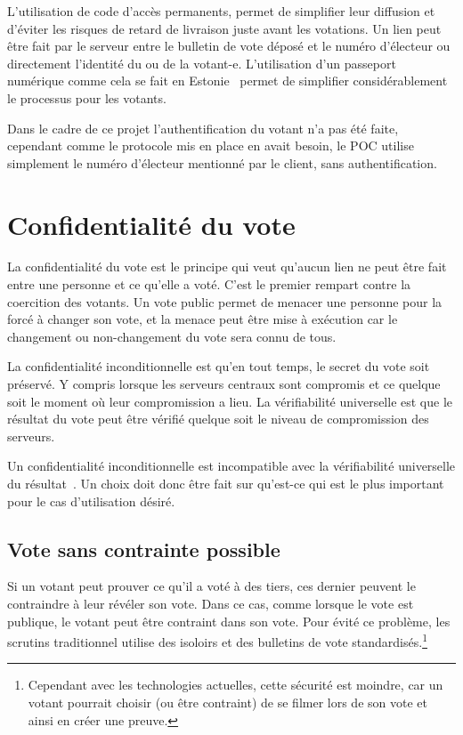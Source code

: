 \documentclass[../report]{subfiles}
\begin{document}
L'utilisation de code d'accès permanents, permet de simplifier leur diffusion et d'éviter les risques de retard de livraison juste avant les votations.
Un lien peut être fait par le serveur entre le bulletin de vote déposé et le numéro d'électeur ou directement l'identité du ou de la votant-e.
L'utilisation d'un passeport numérique comme cela se fait en Estonie~\cite{vassil_diffusion_2016} permet de simplifier considérablement le processus
pour les votants.

Dans le cadre de ce projet l'authentification du votant n'a pas été faite, cependant comme le protocole mis en place en avait besoin, le POC utilise 
simplement le numéro d'électeur mentionné par le client, sans authentification.

\section{Confidentialité du vote}

La confidentialité du vote est le principe qui veut qu'aucun lien ne peut être fait entre une personne et ce qu'elle a voté.
C'est le premier rempart contre la coercition des votants.
Un vote public permet de menacer une personne pour la forcé à changer son vote, et la menace peut être mise à exécution
car le changement ou non-changement du vote sera connu de tous.

La confidentialité inconditionnelle est qu'en tout temps, le secret du vote soit préservé.
Y compris lorsque les serveurs centraux sont compromis et ce quelque soit le moment où leur compromission a lieu.
La vérifiabilité universelle est que le résultat du vote peut être vérifié quelque soit le niveau de compromission
des serveurs.

Un confidentialité inconditionnelle est incompatible avec la vérifiabilité universelle du 
résultat~\cite{chevallier-mames_incompatible_2010,gharadaghy_verifiability_2010}.
Un choix doit donc être fait sur qu'est-ce qui est le plus important pour le cas d'utilisation désiré.

\subsection{Vote sans contrainte possible}

Si un votant peut prouver ce qu'il a voté à des tiers, ces dernier peuvent le contraindre à leur révéler son vote.
Dans ce cas, comme lorsque le vote est publique, le votant peut être contraint dans son vote. 
Pour évité ce problème, les scrutins traditionnel utilise des isoloirs et des bulletins de vote 
standardisés.\footnote{Cependant avec les technologies actuelles, cette sécurité est moindre, car un votant pourrait 
	choisir (ou être contraint) de se filmer lors de son vote et ainsi en créer une preuve.}
\end{document}
